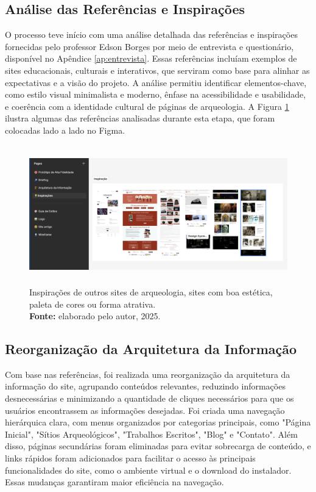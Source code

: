 \subsection{Análise das Referências e Inspirações}
O processo teve início com uma análise detalhada das referências e inspirações fornecidas pelo professor Edson Borges por meio de entrevista e questionário, disponível no Apêndice \ref{ap:entrevista}. Essas referências incluíam exemplos de sites educacionais, culturais e interativos, que serviram como base para alinhar as expectativas e a visão do projeto. A análise permitiu identificar elementos-chave, como estilo visual minimalista e moderno, ênfase na acessibilidade e usabilidade, e coerência com a identidade cultural de páginas de arqueologia. A Figura \ref{fig:inpirações} ilustra algumas das referências analisadas durante esta etapa, que foram colocadas lado a lado no Figma.

\begin{figure}[H]
    \centering
    \includegraphics[height=6cm, keepaspectratio]{img/Protótipo/inspiração.png}
    \caption{ Inspirações de outros sites de arqueologia, sites com boa estética, \\ paleta de cores ou forma atrativa. \\
        \textbf{Fonte:} elaborado pelo autor, 2025.}
    \label{fig:inpirações}
\end{figure}

\subsection{Reorganização da Arquitetura da Informação}
Com base nas referências, foi realizada uma reorganização da arquitetura da informação do site, agrupando conteúdos relevantes, reduzindo informações desnecessárias e minimizando a quantidade de cliques necessários para que os usuários encontrassem as informações desejadas. Foi criada uma navegação hierárquica clara, com menus organizados por categorias principais, como "Página Inicial", "Sítios Arqueológicos", "Trabalhos Escritos", "Blog" e "Contato". Além disso, páginas secundárias foram eliminadas para evitar sobrecarga de conteúdo, e links rápidos foram adicionados para facilitar o acesso às principais funcionalidades do site, como o ambiente virtual e o download do instalador. Essas mudanças garantiram maior eficiência na navegação.

